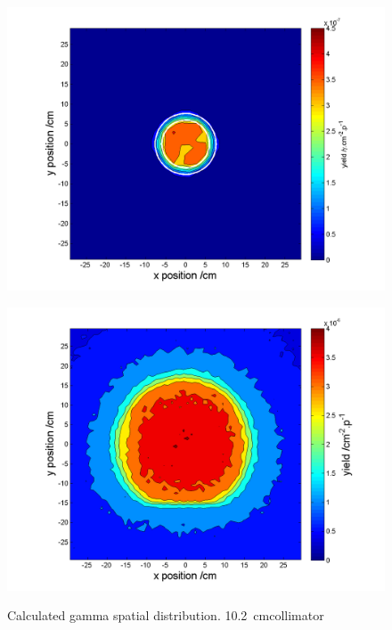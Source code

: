\documentclass[11pt,a4paper]{IEEEtran}
\let\MYoriglatexcaption\caption
\renewcommand{\caption}[2][\relax]{\MYoriglatexcaption[#2]{#2}}
\begin{document}
\begin{figure}[t]
    \begin{minipage}{\columnwidth}
        \includegraphics[width=\columnwidth]{SUP10ColSpatialDistributionAllG.png}
        \label{fig:GammaSpatialDistributionSUP}
    \end{minipage}
    \begin{minipage}{\columnwidth}
        \includegraphics[width=\columnwidth]{CUP10ColSpatialDistributionAllG.png}
        \label{fig:GammaSpatialDistributionCUP}
    \end{minipage}
    \caption{
        Calculated gamma spatial distribution.
        \SI{10.2}{\cm}collimator
    }
    \label{fig:GammaSpatialDistribution}
\end{figure}
\end{document}
